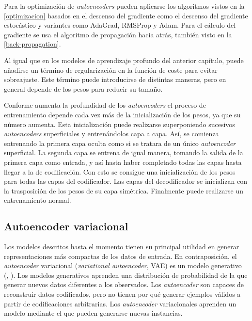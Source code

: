 Para la optimización de \textit{autoencoders} pueden aplicarse los algoritmos vistos en la \autoref{optimizacion} basados en el descenso del gradiente como el descenso del gradiente estocástico y variantes como AdaGrad, RMSProp y Adam. Para el cálculo del gradiente se usa el algoritmo de propagación hacia atrás, también visto en la \autoref{back-propagation}.

Al igual que en los modelos de aprendizaje profundo del anterior capítulo, puede añadirse un término de regularización en la función de coste para evitar sobreajuste. Este término puede introducirse de distintas maneras, pero en general depende de los pesos para reducir su tamaño.

Conforme aumenta la profundidad de los \textit{autoencoders} el proceso de entrenamiento depende cada vez más de la inicialización de los pesos, ya que su número aumenta. Esta inicialización puede realizarse superponiendo sucesivos \textit{autoencoders} superficiales y entrenándolos capa a capa. Así, se comienza entrenando la primera capa oculta como si se tratara de un único \textit{autoencoder} superficial. La segunda capa se entrena de igual manera, tomando la salida de la primera capa como entrada, y así hasta haber completado todas las capas hasta llegar a la de codificación. Con esto se consigue una inicialización de los pesos para todas las capas del codificador. Las capas del decodificador se inicializan con la trasposición de los pesos de su capa simétrica. Finalmente puede realizarse un entrenamiento normal.

\subsection{Autoencoder variacional}

Los modelos descritos hasta el momento tienen su principal utilidad en generar representaciones más compactas de los datos de entrada. En contraposición, el \textit{autoencoder} variacional (\textit{variational autoencoder}, VAE) es un modelo generativo (\cite{kingma2013auto}, \cite{rezende2014stochastic}). Los modelos generativos aprenden una distribución de probabilidad de la que generar nuevos datos diferentes a los observados. Los \textit{autoencoder} son capaces de reconstruir datos codificados, pero no tienen por qué generar ejemplos válidos a partir de codificaciones arbitrarias. Los \textit{autoencoder} variacionales aprenden un modelo mediante el que pueden generarse nuevas instancias.

